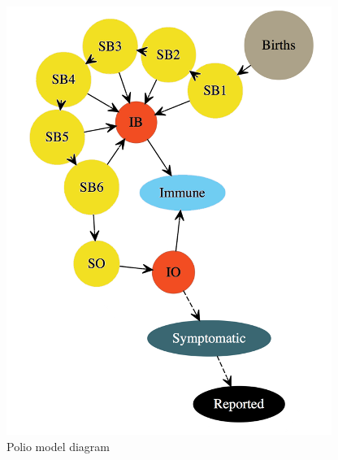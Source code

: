 \documentclass[]{article}
\begin{document}
\begin{figure}
\centering
\includegraphics{./polio_fig1A.png}
\caption{Polio model diagram}
\end{figure}
\end{document}
